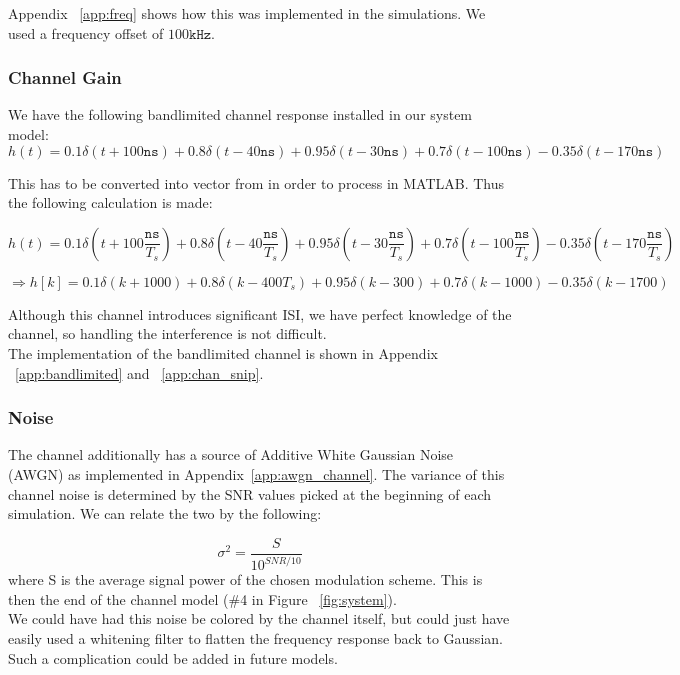 \documentclass[]{article}
\begin{document}
Appendix ~\ref{app:freq} shows how this was implemented in the simulations.  We used a frequency offset of $100 \mathtt{kHz}$.  

\subsubsection{Channel Gain}
\label{sec:channelFilter}
We  have the following bandlimited channel response installed in our system model:
 $$h(t) = 0.1\delta(t + 100 \mathtt{ns}) + 0.8\delta(t -40 \mathtt{ns}) + 0.95\delta(t - 30 \mathtt{ns}) + 0.7\delta(t - 100 \mathtt{ns}) - 0.35\delta(t - 170 \mathtt{ns})  $$
 
This has to be converted into vector from in order to process in MATLAB. Thus the following calculation is made: 
 
 $$h(t) = 0.1\delta(t + 100 \frac{\mathtt{ns}}{T_s}) + 0.8\delta(t -40 \frac{\mathtt{ns}}{T_s}) + 0.95\delta(t - 30 \frac{\mathtt{ns}}{T_s}) + 0.7\delta(t - 100 \frac{\mathtt{ns}}{T_s}) - 0.35\delta(t - 170 \frac{\mathtt{ns}}{T_s})  $$
 
 $$ \Rightarrow h[k] = 0.1\delta(k + 1000) + 0.8\delta(k -400 T_s) + 0.95\delta(k - 300) + 0.7\delta(k - 1000) - 0.35\delta(k - 1700)$$
 
Although this channel introduces significant ISI, we have perfect knowledge of the channel, so handling the interference is not difficult. \\

The implementation of the bandlimited channel is shown in Appendix ~\ref{app:bandlimited} and  ~\ref{app:chan_snip}.

\subsubsection{Noise}
\label{sec:awgn}
The channel additionally has a source of Additive White Gaussian Noise (AWGN) as implemented in Appendix~\ref{app:awgn_channel}. The variance of this channel noise is determined by the SNR values picked at the beginning of each simulation. We can relate the two by the following:

$$\sigma^2 = \frac{S}{10^{SNR/10}}$$
where S is the average signal power of the chosen modulation scheme.  This is then the end of the channel model (\#4 in Figure ~\ref{fig:system}). \\

We could have had this noise be colored by the channel itself, but could just have easily used a whitening filter to flatten the frequency response back to Gaussian.  Such a complication could be added in future models.  
\end{document}
